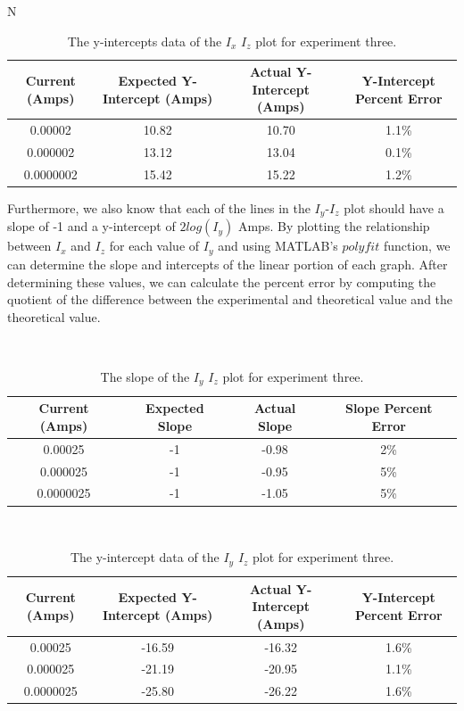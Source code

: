N\documentclass{article}
\begin{document}
\begin{table}[h]
    \centering
    \begin{tabular}{|c|c|c|c|}
        \hline
        Current (Amps) & Expected Y-Intercept (Amps) & Actual Y-Intercept (Amps) & Y-Intercept Percent Error \\ \hline
        0.00002 & 10.82 & 10.70 & 1.1\%  \\ \hline
        0.000002 & 13.12 & 13.04 & 0.1\% \\  \hline 
        0.0000002 & 15.42 & 15.22 & 1.2\% \\ \hline
    \end{tabular}    
    \caption{The y-intercepts data of the $I_x$ $I_z$ plot for experiment three.}
    \label{tab:my_label}
\end{table}

Furthermore, we also know that each of the lines in the $I_y$-$I_z$ plot should have a slope of -1 and a y-intercept of $2log(I_y)$ Amps. By plotting the relationship between $I_x$ and $I_z$ for each value of $I_y$ and using MATLAB's $polyfit$ function, we can determine the slope and intercepts of the linear portion of each graph. After determining these values, we can calculate the percent error by computing the quotient of the difference between the experimental and theoretical value and the theoretical value.

\\
\begin{table}[h]
    \centering
    \begin{tabular}{|c|c|c|c|}
        \hline
        Current (Amps) & Expected Slope & Actual Slope & Slope Percent Error \\ \hline
        0.00025 & -1 & -0.98 & 2\%  \\ \hline
        0.000025 & -1 & -0.95 & 5\% \\  \hline 
        0.0000025 & -1 & -1.05 & 5\% \\ \hline
    \end{tabular}
    \caption{The slope of the $I_y$ $I_z$ plot for experiment three.}
    \label{tab:my_label}
\end{table}
\\
\begin{table}[h]
    \centering
    \begin{tabular}{|c|c|c|c|}
        \hline
        Current (Amps) & Expected Y-Intercept (Amps) & Actual Y-Intercept (Amps) & Y-Intercept Percent Error \\ \hline
        0.00025 & -16.59 & -16.32 & 1.6\%  \\ \hline
        0.000025 & -21.19 & -20.95 & 1.1\% \\  \hline 
        0.0000025 & -25.80 & -26.22 & 1.6\% \\ \hline
    \end{tabular}    
    \caption{The y-intercept data of the $I_y$ $I_z$ plot for experiment three.}
    \label{tab:my_label}
\end{table}
\end{document}
